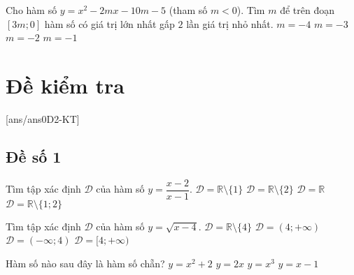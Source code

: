 \begin{ex}%
	Cho hàm số $y=x^2-2mx-10m-5$ (tham số $m<0$). Tìm $m$ để trên đoạn $[3m;0]$ hàm số có giá trị lớn nhất gấp $2$ lần giá trị nhỏ nhất.
	\choice
	{$m=-4$}
	{$m=-3$ }
	{$m=-2$}
	{\True $m=-1$} 
\end{ex}

\section{Đề kiểm tra}
[ans/ans0D2-KT]
\subsection*{Đề số 1}
\begin{ex}%
	Tìm tập xác định $\mathscr{D}$ của hàm số $y=\dfrac{x-2}{x-1}$.
	\choice
	{\True $\mathscr{D}=\mathbb{R}\setminus\{1\}$}
	{$\mathscr{D}=\mathbb{R}\setminus\{2\}$}
	{$\mathscr{D}=\mathbb{R}$}
	{$\mathscr{D}=\mathbb{R}\setminus\{1;2\}$}
\end{ex}

\begin{ex}%
	Tìm tập xác định $\mathscr{D}$ của hàm số $y=\sqrt{x-4}$.
	\choice
	{$\mathscr{D}=\mathbb{R}\setminus\{4\}$}
	{$\mathscr{D}=(4;+\infty)$}
	{$\mathscr{D}=(-\infty;4)$}
	{\True $\mathscr{D}=[4;+\infty)$}
	\loigiai{
		Hàm số đã cho xác đinh khi $x\ge 4$. Vậy $\mathscr{D}=[4;+\infty)$.
	}
\end{ex}

\begin{ex}%
	Hàm số nào sau đây là hàm số chẵn?
	\choice
	{\True $y=x^2+2$}
	{$y=2x$}
	{$y=x^3$}
	{$y=x-1$}
\end{ex}
